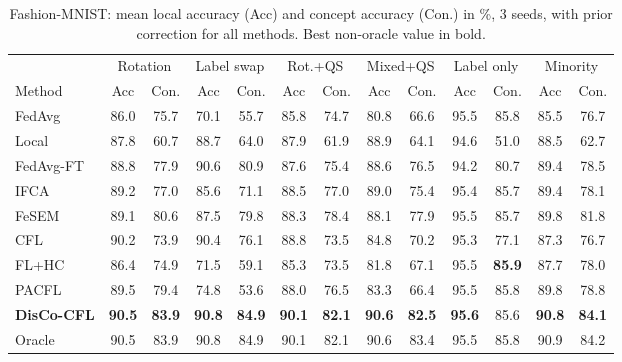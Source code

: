 \documentclass[journal]{IEEEtran}
\theoremstyle{definition}
\begin{document}
\begin{table}[t]
\centering
\caption{Fashion-MNIST: mean local accuracy (Acc) and concept accuracy (Con.) in \%, 3 seeds, with prior correction for all methods. Best non-oracle value in bold.}\label{tab:fmnist}
\footnotesize
\begin{tabular}{lcccccccccccc}
\toprule
 & \multicolumn{2}{c}{Rotation} & \multicolumn{2}{c}{Label swap} & \multicolumn{2}{c}{Rot.+QS} & \multicolumn{2}{c}{Mixed+QS} & \multicolumn{2}{c}{Label only} & \multicolumn{2}{c}{Minority} \\
\cmidrule(lr){2-3}\cmidrule(lr){4-5}\cmidrule(lr){6-7}\cmidrule(lr){8-9}\cmidrule(lr){10-11}\cmidrule(lr){12-13}
Method & Acc & Con. & Acc & Con. & Acc & Con. & Acc & Con. & Acc & Con. & Acc & Con. \\
\midrule
FedAvg & 86.0 & 75.7 & 70.1 & 55.7 & 85.8 & 74.7 & 80.8 & 66.6 & 95.5 & 85.8 & 85.5 & 76.7 \\
Local & 87.8 & 60.7 & 88.7 & 64.0 & 87.9 & 61.9 & 88.9 & 64.1 & 94.6 & 51.0 & 88.5 & 62.7 \\
FedAvg-FT & 88.8 & 77.9 & 90.6 & 80.9 & 87.6 & 75.4 & 88.6 & 76.5 & 94.2 & 80.7 & 89.4 & 78.5 \\
IFCA & 89.2 & 77.0 & 85.6 & 71.1 & 88.5 & 77.0 & 89.0 & 75.4 & 95.4 & 85.7 & 89.4 & 78.1 \\
FeSEM & 89.1 & 80.6 & 87.5 & 79.8 & 88.3 & 78.4 & 88.1 & 77.9 & 95.5 & 85.7 & 89.8 & 81.8 \\
CFL & 90.2 & 73.9 & 90.4 & 76.1 & 88.8 & 73.5 & 84.8 & 70.2 & 95.3 & 77.1 & 87.3 & 76.7 \\
FL+HC & 86.4 & 74.9 & 71.5 & 59.1 & 85.3 & 73.5 & 81.8 & 67.1 & 95.5 & \textbf{85.9} & 87.7 & 78.0 \\
PACFL & 89.5 & 79.4 & 74.8 & 53.6 & 88.0 & 76.5 & 83.3 & 66.4 & 95.5 & 85.8 & 89.8 & 78.8 \\
\textbf{DisCo-CFL} & \textbf{90.5} & \textbf{83.9} & \textbf{90.8} & \textbf{84.9} & \textbf{90.1} & \textbf{82.1} & \textbf{90.6} & \textbf{82.5} & \textbf{95.6} & 85.6 & \textbf{90.8} & \textbf{84.1} \\
\midrule
Oracle & 90.5 & 83.9 & 90.8 & 84.9 & 90.1 & 82.1 & 90.6 & 83.4 & 95.5 & 85.8 & 90.9 & 84.2 \\
\bottomrule
\end{tabular}
\end{table}
\end{document}
